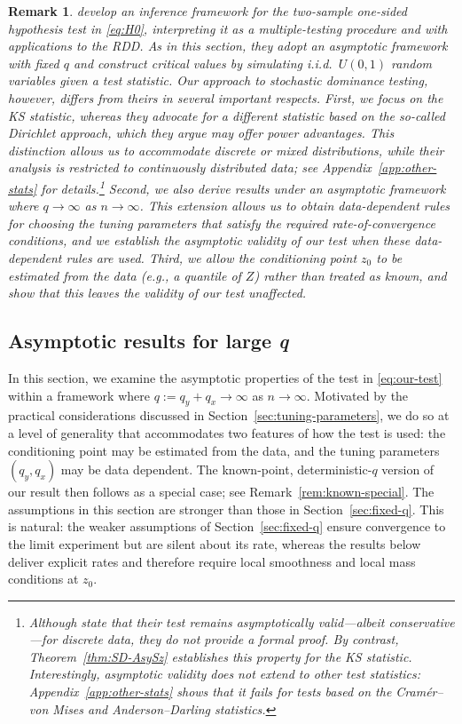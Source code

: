 \documentclass[11pt]{article}
\numberwithin{equation}{section}
\newtheorem{remark}{Remark}%
\begin{document}
\begin{remark}
\citet{goldman/kaplan:2018} develop an inference framework for the two-sample one-sided hypothesis test in \eqref{eq:H0}, interpreting it as a multiple-testing procedure and with applications to the RDD. As in this section, they adopt an asymptotic framework with fixed $q$ and construct critical values by simulating i.i.d.\ $U(0,1)$ random variables given a test statistic. Our approach to stochastic dominance testing, however, differs from theirs in several important respects. First, we focus on the KS statistic, whereas they advocate for a different statistic based on the so-called Dirichlet approach, which they argue may offer power advantages. This distinction allows us to accommodate discrete or mixed distributions, while their analysis is restricted to continuously distributed data; see Appendix~\ref{app:other-stats} for details.\footnote{Although \citet[][p.~146]{goldman/kaplan:2018} state that their test remains asymptotically valid—albeit conservative—for discrete data, they do not provide a formal proof. By contrast, Theorem~\ref{thm:SD-AsySz} establishes this property for the KS statistic. Interestingly, asymptotic validity does not extend to other test statistics: Appendix~\ref{app:other-stats} shows that it fails for tests based on the Cramér--von Mises and Anderson--Darling statistics.} Second, we also derive results under an asymptotic framework where $q \to \infty$ as $n \to \infty$. This extension allows us to obtain data-dependent rules for choosing the tuning parameters that satisfy the required rate-of-convergence conditions, and we establish the asymptotic validity of our test when these data-dependent rules are used. Third, we allow the conditioning point $z_0$ to be estimated from the data (e.g., a quantile of $Z$) rather than treated as known, and show that this leaves the validity of our test unaffected.
    \end{remark}

\subsection{Asymptotic results for large \emph{q}}\label{sec:large-q}

In this section, we examine the asymptotic properties of the test in \eqref{eq:our-test} within a framework where $q:=q_y+q_x\to\infty$ as $n\to\infty$. Motivated by the practical considerations discussed in Section~\ref{sec:tuning-parameters}, we do so at a level of generality that accommodates two features of how the test is used: the conditioning point may be estimated from the data, and the tuning parameters $(q_y,q_x)$ may be data dependent. The known-point, deterministic-$q$ version of our result then follows as a special case; see Remark~\ref{rem:known-special}. The assumptions in this section are stronger than those in Section~\ref{sec:fixed-q}. This is natural: the weaker assumptions of Section~\ref{sec:fixed-q} ensure convergence to the limit experiment but are silent about its rate, whereas the results below deliver explicit rates and therefore require local smoothness and local mass conditions at $z_0$.
\end{document}
